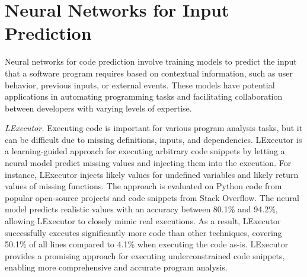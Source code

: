 \section{Neural Networks for Input Prediction}
Neural networks for code prediction involve training models to predict the input that a software program requires based on contextual information, such as user behavior, previous inputs, or external events.
These models have potential applications in automating programming tasks and facilitating collaboration between developers with varying levels of expertise.

\textit{LExecutor.} Executing code is important for various program analysis tasks, but it can be difficult due to missing definitions, inputs, and dependencies. LExecutor is a learning-guided approach for executing arbitrary code snippets by letting a neural model predict missing values and injecting them into the execution. For instance, LExecutor injects likely values for undefined variables and likely return values of missing functions. The approach is evaluated on Python code from popular open-source projects and code snippets from Stack Overflow. The neural model predicts realistic values with an accuracy between 80.1\% and 94.2\%, allowing LExecutor to closely mimic real executions. As a result, LExecutor successfully executes significantly more code than other techniques, covering 50.1\% of all lines compared to 4.1\% when executing the code as-is. LExecutor provides a promising approach for executing underconstrained code snippets, enabling more comprehensive and accurate program analysis. \cite{LExecutor_2023}
